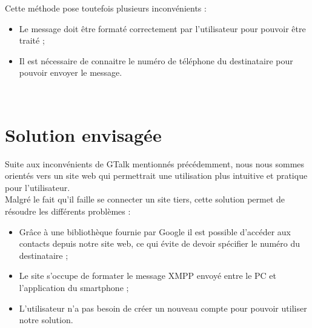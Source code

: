 Cette méthode pose toutefois plusieurs inconvénients :
\begin{itemize}
	\item Le message doit être formaté correctement par l'utilisateur pour pouvoir être traité ;
	\item Il est nécessaire de connaitre le numéro de téléphone du destinataire pour pouvoir envoyer le message.
\end{itemize}
~~\\






\section{Solution envisagée}

Suite aux inconvénients de GTalk mentionnés précédemment, nous nous sommes orientés vers un site web qui permettrait une utilisation plus intuitive et pratique pour l'utilisateur.
\\

Malgré le fait qu'il faille se connecter un site tiers, cette solution permet de résoudre les différents problèmes :
\begin{itemize}
	\item Grâce à une bibliothèque fournie par Google il est possible d'accéder aux contacts depuis notre site web, ce qui évite de devoir spécifier le numéro du destinataire ;
	\item Le site s'occupe de formater le message XMPP envoyé entre le PC et l'application du smartphone ;
	\item L'utilisateur n'a pas besoin de créer un nouveau compte pour pouvoir utiliser notre solution.
\\
\end{itemize}


